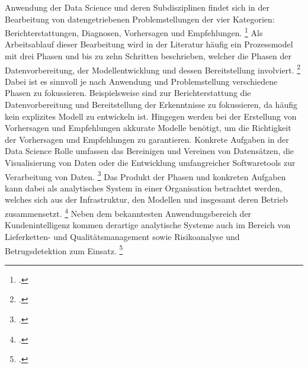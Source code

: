 Anwendung der Data Science und deren Subdisziplinen findet sich in der Bearbeitung von datengetriebenen Problemstellungen der vier Kategorien: Berichterstattungen, Diagnosen, Vorhersagen und Empfehlungen. \footcite[Vgl.][S. 10]{vanderAalst.2016}
Als Arbeitsablauf dieser Bearbeitung wird in der Literatur häufig ein Prozessmodel mit drei Phasen und bis zu zehn Schritten beschrieben, welcher die Phasen der Datenvorbereitung, der Modellentwicklung und dessen Bereitstellung involviert. \footcite[Vgl.][S. 1]{Zhang.2020b}
Dabei ist es sinnvoll je nach Anwendung und Problemstellung verschiedene Phasen zu fokussieren.
Beispielsweise sind zur Berichterstattung die Datenvorbereitung und Bereitstellung der Erkenntnisse zu fokussieren, da häufig kein explizites Modell zu entwickeln ist.
Hingegen werden bei der Erstellung von Vorhersagen und Empfehlungen akkurate Modelle benötigt, um die Richtigkeit der Vorhersagen und Empfehlungen zu garantieren.
Konkrete Aufgaben in der Data Science Rolle umfassen das Bereinigen und Vereinen von Datensätzen, die Visualisierung von Daten oder die Entwicklung umfangreicher Softwaretools zur Verarbeitung von Daten. \footcite[Vgl.][S. 13]{Patil.2011}
Das Produkt der Phasen und konkreten Aufgaben kann dabei als analytisches System in einer Organisation betrachtet werden, welches sich aus der Infrastruktur, den Modellen und insgesamt deren Betrieb zusammensetzt. \footcite[Vgl.][S. 22]{Grossman.2014}
Neben dem bekanntesten Anwendungsbereich der Kundenintelligenz kommen derartige analytische Systeme auch im Bereich von Lieferketten- und Qualitätsmanagement sowie Risikoanalyse und Betrugsdetektion zum Einsatz. \footcite[Vgl.][S. 221ff.]{Elgendy.2014}
